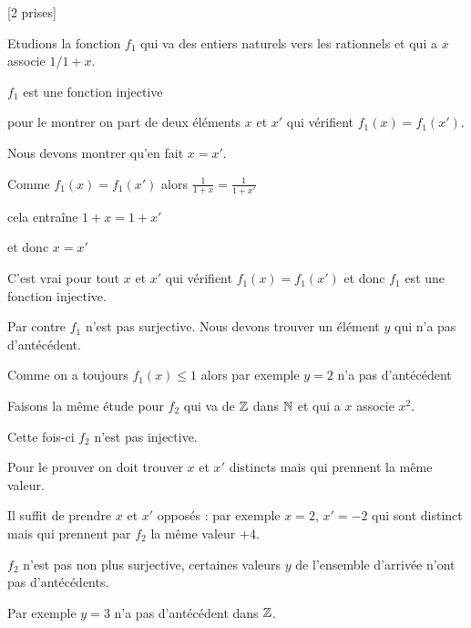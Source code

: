 \diapo

[2 prises]

Etudions la fonction $f_1$ qui va des entiers naturels vers les rationnels et qui a $x$ associe $1/1+x$.

\change

$f_1$ est une fonction injective 

\change

pour le montrer on part de deux éléments $x$ et $x'$ qui vérifient $f_1(x)=f_1(x')$.

Nous devons montrer qu'en fait $x=x'$.

\change

Comme $f_1(x)=f_1(x')$ alors $\frac{1}{1+x}=\frac{1}{1+x'}$

\change

cela entraîne $1+x=1+x'$ 

\change

et donc $x=x'$ 

C'est vrai pour tout $x$ et $x'$ qui vérifient  $f_1(x)=f_1(x')$ et donc $f_1$ est une fonction injective.

\change

Par contre  $f_1$ n'est pas surjective. Nous devons trouver
un élément $y$ qui n'a pas d'antécédent.

\change

Comme on a toujours  $f_1(x) \le 1$ alors par exemple $y=2$ n'a pas d'antécédent 

\change

Faisons la même étude pour $f_2$ qui va de $\mathbb{Z}$ dans $\mathbb{N}$ et qui a $x$ associe $x^2$.

\change

Cette fois-ci $f_2$ n'est pas injective. 

\change

Pour le prouver on doit trouver 
$x$ et $x'$ distincts mais qui prennent la même valeur.


\change

Il suffit de prendre $x$ et $x'$ opposés : par exemple $x=2$, $x'=-2$ 
qui sont distinct mais qui prennent par $f_2$ la même valeur $+4$.


\change

$f_2$ n'est pas non plus surjective, certaines valeurs $y$ de l'ensemble d'arrivée 
n'ont pas d'antécédents. 

\change

Par exemple $y=3$ n'a pas d'antécédent dans $\mathbb{Z}$.

